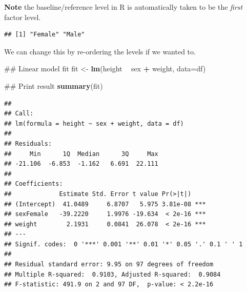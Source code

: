 \documentclass[]{book}
\newenvironment{Shaded}{\begin{snugshade}}{\end{snugshade}}
\newcommand{\KeywordTok}[1]{\textcolor[rgb]{0.13,0.29,0.53}{\textbf{#1}}}
\newcommand{\DataTypeTok}[1]{\textcolor[rgb]{0.13,0.29,0.53}{#1}}
\newcommand{\StringTok}[1]{\textcolor[rgb]{0.31,0.60,0.02}{#1}}
\newcommand{\OperatorTok}[1]{\textcolor[rgb]{0.81,0.36,0.00}{\textbf{#1}}}
\newcommand{\NormalTok}[1]{#1}
\theoremstyle{definition}
\theoremstyle{definition}
\theoremstyle{definition}
\theoremstyle{remark}
\begin{document}
\textbf{Note} the baseline/reference level in R is automatically taken
to be the \emph{first} factor level.

\begin{Shaded}
\end{Shaded}

\begin{verbatim}
## [1] "Female" "Male"
\end{verbatim}

We can change this by re-ordering the levels if we wanted to.

\begin{Shaded}
\end{Shaded}

\begin{Shaded}
\begin{Highlighting}[]
\NormalTok{## Linear model fit}
\NormalTok{fit <-}\StringTok{ }\KeywordTok{lm}\NormalTok{(height }\OperatorTok{~}\StringTok{ }\NormalTok{sex }\OperatorTok{+}\StringTok{ }\NormalTok{weight, }\DataTypeTok{data=}\NormalTok{df)}

\NormalTok{## Print result}
\KeywordTok{summary}\NormalTok{(fit)}
\end{Highlighting}
\end{Shaded}

\begin{verbatim}
## 
## Call:
## lm(formula = height ~ sex + weight, data = df)
## 
## Residuals:
##     Min      1Q  Median      3Q     Max 
## -21.106  -6.853  -1.162   6.691  22.111 
## 
## Coefficients:
##             Estimate Std. Error t value Pr(>|t|)    
## (Intercept)  41.0489     6.8707   5.975 3.81e-08 ***
## sexFemale   -39.2220     1.9976 -19.634  < 2e-16 ***
## weight        2.1931     0.0841  26.078  < 2e-16 ***
## ---
## Signif. codes:  0 '***' 0.001 '**' 0.01 '*' 0.05 '.' 0.1 ' ' 1
## 
## Residual standard error: 9.95 on 97 degrees of freedom
## Multiple R-squared:  0.9103, Adjusted R-squared:  0.9084 
## F-statistic: 491.9 on 2 and 97 DF,  p-value: < 2.2e-16
\end{verbatim}
\end{document}
